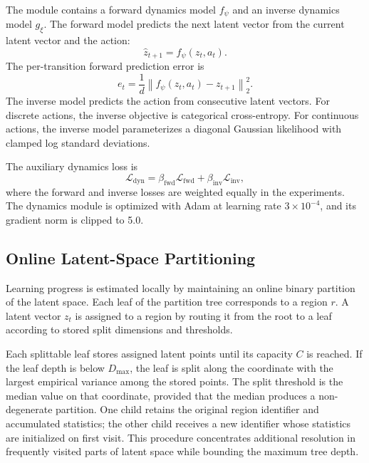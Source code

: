 The module contains a forward dynamics model $f_\psi$ and an inverse dynamics model $g_\xi$.
The forward model predicts the next latent vector from the current latent vector and the action:
\begin{equation}
    \hat{z}_{t+1}=f_\psi(z_t,a_t).
\end{equation}
The per-transition forward prediction error is
\begin{equation}
    e_t
    = \frac{1}{d}\left\lVert f_\psi(z_t,a_t)-z_{t+1}\right\rVert_2^2.
    \label{eq:methodology_forward_error}
\end{equation}
The inverse model predicts the action from consecutive latent vectors.
For discrete actions, the inverse objective is categorical cross-entropy.
For continuous actions, the inverse model parameterizes a diagonal Gaussian likelihood with clamped log standard deviations.

The auxiliary dynamics loss is
\begin{equation}
    \mathcal{L}_{\mathrm{dyn}}
    = \beta_{\mathrm{fwd}}\mathcal{L}_{\mathrm{fwd}}
    + \beta_{\mathrm{inv}}\mathcal{L}_{\mathrm{inv}},
\end{equation}
where the forward and inverse losses are weighted equally in the experiments.
The dynamics module is optimized with Adam at learning rate $3\times 10^{-4}$, and its gradient norm is clipped to 5.0.

\subsection{Online Latent-Space Partitioning}
\label{subsec:methodology_online_partitioning}

Learning progress is estimated locally by maintaining an online binary partition of the latent space.
Each leaf of the partition tree corresponds to a region $r$.
A latent vector $z_t$ is assigned to a region by routing it from the root to a leaf according to stored split dimensions and thresholds.

Each splittable leaf stores assigned latent points until its capacity $C$ is reached.
If the leaf depth is below $D_{\max}$, the leaf is split along the coordinate with the largest empirical variance among the stored points.
The split threshold is the median value on that coordinate, provided that the median produces a non-degenerate partition.
One child retains the original region identifier and accumulated statistics; the other child receives a new identifier whose statistics are initialized on first visit.
This procedure concentrates additional resolution in frequently visited parts of latent space while bounding the maximum tree depth.

